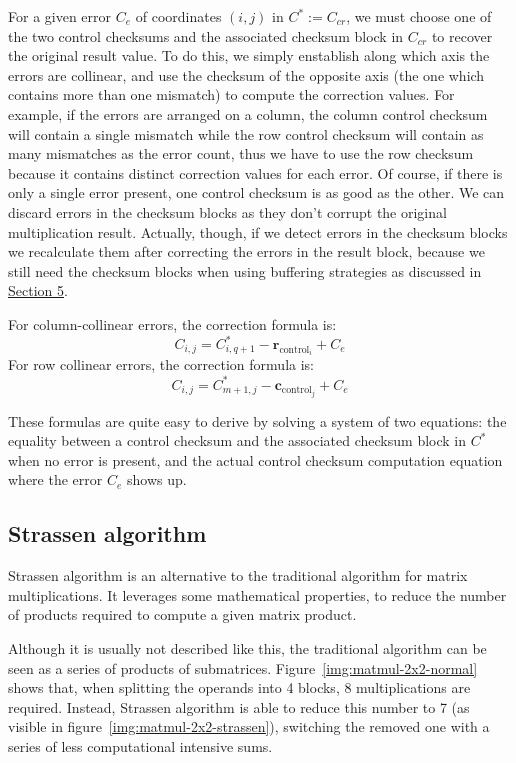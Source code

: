 For a given error $C_e$ of coordinates $(i,j)$ in $C^* := C_{cr}$, we must choose one of the two control checksums and the associated checksum block in $C_{cr}$ to recover the original result value.
To do this, we simply enstablish along which axis the errors are collinear, and use the checksum of the opposite axis (the one which contains more than one mismatch) to compute the correction values.
For example, if the errors are arranged on a column, the column control checksum will contain a single mismatch while the row control checksum will contain as many mismatches as the error count, thus we have to use the row checksum because it contains distinct correction values for each error.
Of course, if there is only a single error present, one control checksum is as good as the other.
We can discard errors in the checksum blocks
as they don't corrupt the original multiplication result.
Actually, though, if we detect errors in the checksum blocks
we recalculate them after correcting the errors in the result block,
because we still need the checksum blocks
when using buffering strategies as discussed in \hyperref[sec:strategies]{Section 5}.

For column-collinear errors, the correction formula is:
\[
	C_{i,j} = C^*_{i,q+1} - \mathbf{r}_{\text{control}_{i}} + C_e
\]
For row collinear errors, the correction formula is:
\[
	C_{i,j} = C^*_{m+1,j} - \mathbf{c}_{\text{control}_{j}} + C_e
\]

These formulas are quite easy to derive by solving a system of two equations:
the equality between a control checksum and the associated checksum block in $C^*$ when no error is present,
and the actual control checksum computation equation where the error $C_e$ shows up.

\subsection{Strassen algorithm}

Strassen algorithm is an alternative to the traditional algorithm for matrix multiplications.
It leverages some mathematical properties, to reduce the number of products required to compute a given matrix product.

Although it is usually not described like this, the traditional algorithm can be seen as a series of products of submatrices.
Figure~\ref{img:matmul-2x2-normal} shows that, when splitting the operands into 4 blocks, 8 multiplications are required.
Instead, Strassen algorithm is able to reduce this number to 7 (as visible in figure~\ref{img:matmul-2x2-strassen}), switching the removed one with a series of less computational intensive sums.

